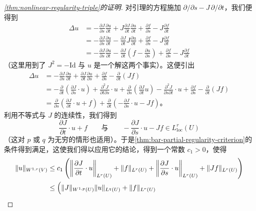 \begin{proof}[\cref{thm:nonlinear-regularity-triple}的证明]
对引理的方程施加 $\partial/\partial s-J\,\partial/\partial t$，我们便得到
\[
\begin{aligned}
\Delta u&=-\frac{\partial J}{\partial s}\frac{\partial u}{\partial t}+J\frac{\partial J}{\partial t}\frac{\partial u}{\partial t}+\frac{\partial f}{\partial s}-J\frac{\partial f}{\partial t}\\
&=-\frac{\partial J}{\partial s}\frac{\partial u}{\partial t}-\frac{\partial J}{\partial t}J\frac{\partial u}{\partial t}+\frac{\partial f}{\partial s}-J\frac{\partial f}{\partial t}\\
&=-\frac{\partial J}{\partial s}\frac{\partial u}{\partial t}-\frac{\partial J}{\partial t}\left(f-\frac{\partial u}{\partial s}\right)+\frac{\partial f}{\partial s}-J\frac{\partial f}{\partial t}
\end{aligned}
\]
（这里用到了 $J^{2}=-\mathrm{Id}$ 与 $u$ 是一个解这两个事实）。这便引出
\[
\begin{aligned}
\Delta u&=-\frac{\partial J}{\partial s}\frac{\partial u}{\partial t}+\frac{\partial J}{\partial t}\frac{\partial u}{\partial s}+\frac{\partial f}{\partial s}-\frac{\partial}{\partial t}(Jf)\\
&=-\frac{\partial}{\partial t}\left(\frac{\partial J}{\partial s}\cdot u\right)+\frac{\partial^{2}J}{\partial t\partial s}\cdot u+\frac{\partial}{\partial s}\left(\frac{\partial J}{\partial t}u\right)-\frac{\partial^{2}J}{\partial s\partial t}\cdot u+\frac{\partial f}{\partial s}-\frac{\partial}{\partial t}(Jf)\\
&=\frac{\partial}{\partial s}\left(\frac{\partial J}{\partial t}\cdot u+f\right)+\frac{\partial}{\partial t}\left(-\frac{\partial J}{\partial s}\cdot u-Jf\right)\text{。}
\end{aligned}
\]
利用\trHoelder{}不等式与 $J$ 的连续性，我们得到
\[
\frac{\partial J}{\partial t}\cdot u+f\qquad\text{与}\qquad-\frac{\partial J}{\partial s}\cdot u-Jf\in L^{r}_{\mathrm{loc}}(U)
\]
（这对 $p$ 或 $q$ 为无穷的情形也适用）。于是\cref{thm:bar-partial-regularity-criterion}的条件得到满足，这使我们得以应用它的结论，得到一个常数 $c_{1}>0$，使得
\[
\begin{aligned}
\|u\|_{W^{1,r}(V)}&\le c_{1}\left(\left\|\frac{\partial J}{\partial t}\cdot u\right\|_{L^{r}(U)}+\|f\|_{L^{r}(U)}+\left\|\frac{\partial J}{\partial s}\cdot u\right\|_{L^{r}(U)}+\|Jf\|_{L^{r}(U)}\right)\\
&\le\Bigl(\|J\|_{W^{1,p}(U)}\|u\|_{L^{q}(U)}+\|f\|_{L^{r}(U)}\\

\end{aligned}\]
\end{proof}

